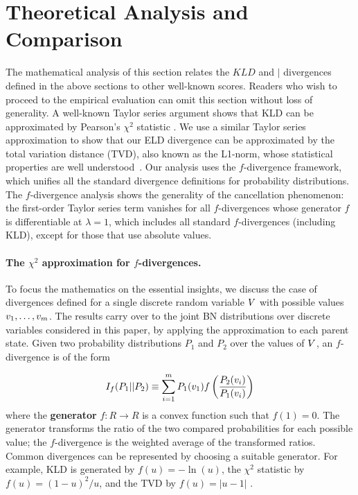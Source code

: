 {\section{Theoretical Analysis and Comparison}
The mathematical analysis of this section relates the $KLD$ and $\mid$ divergences defined in the above sections to other well-known scores. Readers who wish to proceed to the empirical evaluation can omit this section without loss of generality. A well-known Taylor series argument shows that KLD can be approximated by Pearson's $\chi^{2}$ statistic \cite{Nielsen2014}. We use a similar Taylor series approximation to show that our ELD divergence can be approximated by the total variation distance (TVD), also known as the L1-norm, whose statistical properties are well understood~\cite{Beirlant2001,Beirlant1994}. 
Our analysis uses the $f$-divergence framework, which unifies all the standard divergence definitions for probability distributions. The $f$-divergence analysis shows the generality of the cancellation phenomenon: the first-order Taylor series term vanishes for all $f$-divergences whose generator $f$ is differentiable at $\lambda = 1$, which includes all standard $f$-divergences (including KLD), except for those that use absolute values. 

\paragraph{The $\chi^2$ approximation for $f$-divergences.}
To focus the mathematics on the essential insights, we discuss the case of divergences defined for a single discrete random variable $V$ with possible values $v_{1},\ldots,v_{m}$. The results carry over to the joint BN distributions over discrete variables considered in this paper, by applying the approximation to each parent state. Given two probability distributions $P_{1}$ and $P_{2}$ over the values of $V$, an $f$-divergence is of the form 

\begin{equation}
\label{eq:f-divergence}
I_{f}(P_{1}||P_{2}) \equiv \sum_{i=1}^{m} P_{1}(v_{1}) f\left(\frac{P_{2}(v_{i})}{P_{1}(v_{i})}\right)
\end{equation}
%
where the \textbf{generator} $f:R \rightarrow R$ is a convex function such that $f(1)=0$. 
The generator transforms the ratio of the two compared probabilities for each possible value; the $f$-divergence is the weighted average of the transformed ratios. Common divergences can be represented by choosing a suitable generator. For example, KLD is generated by $f(u) = -\ln(u)$, the $\chi^{2}$ statistic by $f(u) = (1-u)^{2}/u$, and the TVD by $f(u) = |u-1|$ \cite{Nielsen2014}. 

}
